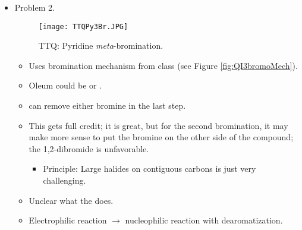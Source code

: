 \documentclass[../notes.tex]{subfiles}
\begin{document}
\begin{itemize}
\begin{itemize}
    \end{itemize}
    \item Problem 2.
    \begin{figure}[H]
        \centering
        \texttt{[image: TTQPy3Br.JPG]}
        \caption{TTQ: Pyridine \emph{meta}-bromination.}
        \label{fig:TTQPy3Br}
    \end{figure}
    \begin{itemize}
        \item Uses bromination mechanism from class (see Figure \ref{fig:QI3bromoMech}).
        \item Oleum could be  or .
        \item {} can remove either bromine in the last step.
        \item This gets full credit; it is great, but for the second bromination, it may make more sense to put the bromine on the other side of the compound; the 1,2-dibromide is unfavorable.
        \begin{itemize}
            \item Principle: Large halides on contiguous carbons is just very challenging.
        \end{itemize}
        \item Unclear what the  does.
        \item Electrophilic reaction $\to$ nucleophilic reaction with dearomatization.
    \end{itemize}
\end{itemize}
\end{document}
